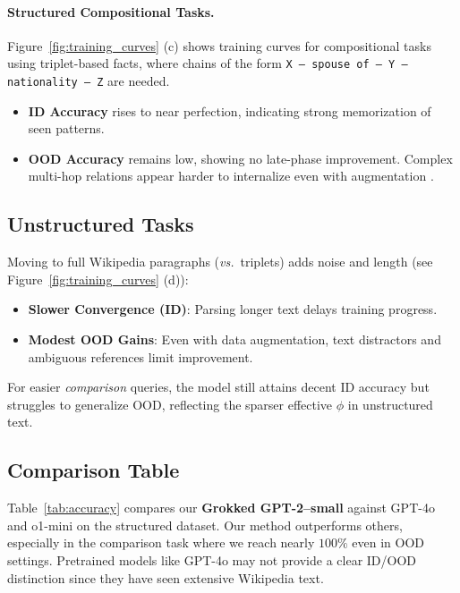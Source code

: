         \paragraph{Structured Compositional Tasks.}
            Figure~\ref{fig:training_curves} (c) shows training curves for compositional tasks using triplet-based facts, 
            where chains of the form \texttt{X -- spouse of -- Y -- nationality -- Z} are needed.
            \begin{itemize}
                \item \textbf{ID Accuracy} rises to near perfection, indicating strong memorization of seen patterns.
                \item \textbf{OOD Accuracy} remains low, showing no late-phase improvement. Complex multi-hop relations 
                appear harder to internalize even with augmentation \citep{nanda2023progress}.
            \end{itemize}
        
    \subsection{Unstructured Tasks}\label{sec:exp_unstructured}
        Moving to full Wikipedia paragraphs (\emph{vs.}\ triplets) adds noise and length (see Figure~\ref{fig:training_curves} (d)):
        \begin{itemize}
            \item \textbf{Slower Convergence (ID)}: Parsing longer text delays training progress.
            \item \textbf{Modest OOD Gains}: Even with data augmentation, text distractors and ambiguous references limit improvement.
        \end{itemize}
        For easier \emph{comparison} queries, the model still attains decent ID accuracy but struggles to generalize OOD, 
        reflecting the sparser effective \(\phi\) in unstructured text.
    
    \subsection{Comparison Table}\label{sec:exp_comparison_table}
        Table~\ref{tab:accuracy} compares our \textbf{Grokked GPT-2--small} against GPT-4o and o1-mini on the structured dataset. 
        Our method outperforms others, especially in the comparison task where we reach nearly $100\%$ even in OOD settings. 
        Pretrained models like GPT-4o may not provide a clear ID/OOD distinction since they have seen extensive Wikipedia text.
        
